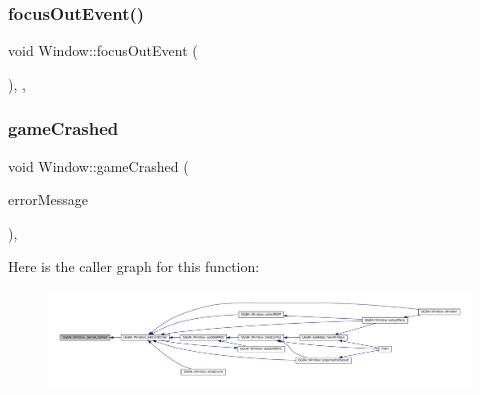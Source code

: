 \subsubsection{\texorpdfstring{focus\+Out\+Event()}{focusOutEvent()}}
{\footnotesize\ttfamily void Window\+::focus\+Out\+Event (\begin{DoxyParamCaption}\item[{Q\+Focus\+Event $\ast$}]{ }\end{DoxyParamCaption})\hspace{0.3cm}{\ttfamily [override]}, {\ttfamily [protected]}, {\ttfamily [virtual]}}

\mbox{\label{class_q_g_b_a_1_1_window_a09a4bcd828c324cfeac69ba112f2b8a4}} 
\subsubsection{\texorpdfstring{game\+Crashed}{gameCrashed}}
{\footnotesize\ttfamily void Window\+::game\+Crashed (\begin{DoxyParamCaption}\item[{const Q\+String \&}]{error\+Message }\end{DoxyParamCaption})\hspace{0.3cm}{\ttfamily [private]}, {\ttfamily [slot]}}

Here is the caller graph for this function\+:
\nopagebreak
\begin{figure}[H]
\begin{center}
\leavevmode
\includegraphics[width=350pt]{class_q_g_b_a_1_1_window_a09a4bcd828c324cfeac69ba112f2b8a4_icgraph}
\end{center}
\end{figure}
\mbox{\label{class_q_g_b_a_1_1_window_a0dab910499bdba9274abdb3dfeb699f1}} 
